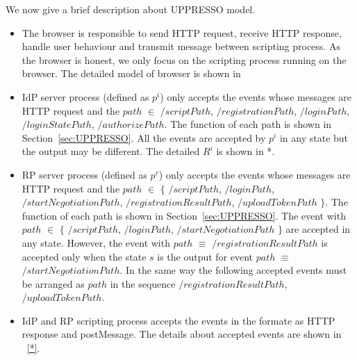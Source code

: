 We now give a brief description about UPPRESSO model.
\begin{itemize}
\item The browser is responsible to send HTTP request, receive HTTP response, handle user behaviour and transmit message between scripting process. As the browser is honest, we only focus on the  scripting process running on the browser. The detailed model of browser is shown in~\cite{SPRESSO} 
\item IdP server process (defined as $p^i$) only accepts the events whose messages are HTTP request and the $path$ $\in$ {$/scriptPath$, $/registrationPath$, $/loginPath$, $/loginStatePath$, $/authorizePath$}. The function of each path is shown in Section~\ref{sec:UPPRESSO}.  All the events are accepted by $p^i$ in any state but the output may be different. The detailed $R^i$ is shown in *.  
\item RP server process (defined as $p^r$) only accepts the events whose messages are HTTP request and the $path$ $\in$ $\{$ $/scriptPath$, $/loginPath$, $/startNegotiationPath$,  $/registrationResultPath$, $/uploadTokenPath$ $\}$. The function of each path is shown in Section~\ref{sec:UPPRESSO}. The event with $path$ $\in$  $\{$ $/scriptPath$, $/loginPath$, $/startNegotiationPath$ $\}$ are accepted in any state. However, the event with $path$ $\equiv$ $/registrationResultPath$ is accepted only when the state $s$ is the output for event  $path$ $\equiv$ $/startNegotiationPath$. In the same way the following accepted events must be arranged as $path$  in the sequence $/registrationResultPath$, $/uploadTokenPath$.
\item IdP and RP scripting process accepts the events in the formate as HTTP response and postMessage. The details about accepted events are shown in ~\ref{*}.
\end{itemize}

